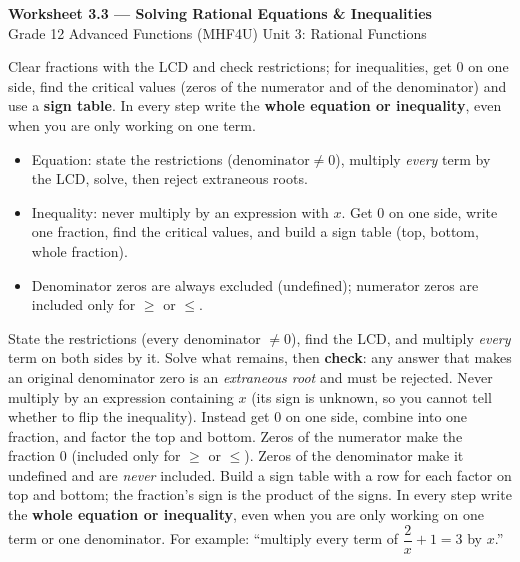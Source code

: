 \documentclass[11pt]{article}
\begin{document}
\begin{center}
{\LARGE\bfseries\color{titleblue}Worksheet 3.3 --- Solving Rational Equations \& Inequalities}\\[2pt]
{\small Grade 12 Advanced Functions (MHF4U) \textperiodcentered{} Unit 3: Rational Functions}
\end{center}

\begin{ideabox}
Clear fractions with the LCD and check restrictions; for inequalities, get $0$ on one side, find the critical values (zeros of the numerator and of the denominator) and use a \textbf{sign table}. In every step write the \textbf{whole equation or inequality}, even when you are only working on one term.
\begin{itemize}[leftmargin=*,itemsep=2pt]
  \item Equation: state the restrictions ($\text{denominator}\ne0$), multiply \emph{every} term by the LCD, solve, then reject extraneous roots.
  \item Inequality: never multiply by an expression with $x$. Get $0$ on one side, write one fraction, find the critical values, and build a sign table (top, bottom, whole fraction).
  \item Denominator zeros are always excluded (undefined); numerator zeros are included only for $\ge$ or $\le$.
\end{itemize}
\end{ideabox}

\begin{learnbox}
State the restrictions (every denominator $\ne0$), find the LCD, and multiply \emph{every} term on both sides by it. Solve what remains, then \textbf{check}: any answer that makes an original denominator zero is an \emph{extraneous root} and must be rejected.
Never multiply by an expression containing $x$ (its sign is unknown, so you cannot tell whether to flip the inequality). Instead get $0$ on one side, combine into one fraction, and factor the top and bottom.
Zeros of the numerator make the fraction $0$ (included only for $\ge$ or $\le$). Zeros of the denominator make it undefined and are \emph{never} included. Build a sign table with a row for each factor on top and bottom; the fraction's sign is the product of the signs.
In every step write the \textbf{whole equation or inequality}, even when you are only working on one term or one denominator. For example: ``multiply every term of $\dfrac2x+1=3$ by $x$.''
\end{learnbox}
\end{document}
